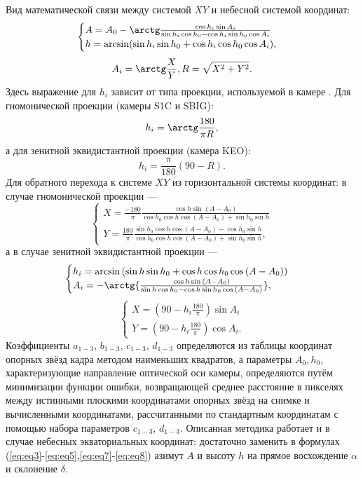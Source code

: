 \documentclass[12pt,a4paper]{article}
\begin{document}
Вид математической связи между системой $XY$ и небесной системой координат:
\begin{equation}\label{eq:eq3}
\begin{cases}
A = A_0 - \arctg\frac{\cos h_i\sin A_i}{\sin h_i \cos h_0 -\cos h_i \sin h_0 \cos A_i}\\
h = \arcsin (\sin h_i \sin h_0 + \cos h_i \cos h_0 \cos A_i),
\end{cases}
\end{equation}
\begin{equation}\label{eq:eq5}
A_i = \arctg\frac{X}{Y}, R = \sqrt{X^2 + Y^2}.
\end{equation} 
Здесь выражение для $h_i$ зависит от типа проекции, используемой в камере \cite{Calabretta2002}. Для гномонической проекции (камеры S1C и SBIG): 
\begin{equation}\label{eq:eq7}
h_i = \arctg\frac{180}{\pi R},
\end{equation}
а для зенитной эквидистантной проекции (камера KEO): 
\begin{equation}\label{eq:eq8}
h_i = \frac{\pi}{180}(90-R).
\end{equation}
Для обратного перехода к системе $XY$ из горизонтальной системы координат: в случае гномонической проекции ---
\begin{equation}\label{eq:eq8_dop}
\begin{cases}
X=\frac{-180}{\pi}\frac{\cos{h}\sin{(A-A_0)}}{\cos{h_0}\cos{h}\cos{(A-A_0)}+\sin{h_0}\sin{h}}\\
Y=\frac{180}{\pi}
\frac{\sin{h_0}\cos{h}\cos{(A-A_0)}-\cos{h_0}\sin{h}}
{\cos{h_0}\cos{h}\cos{(A-A_0)}+\sin{h_0}\sin{h}},
\end{cases}
\end{equation}
а в случае зенитной эквидистантной проекции ---
\begin{equation}\label{eq:eq9_dop}
\begin{cases}
h_i=\arcsin{(\sin{h}\sin{h_0}+\cos{h}\cos{h_0}\cos{(A-A_0)})}\\
A_i=-\arctg{\frac
	{\cos{h}\sin{(A-A_0)}}
	{\sin{h}\cos{h_0}-\cos{h}\sin{h_0}\cos{(A-A_0)}}},
\end{cases}
\end{equation}
\begin{equation}\label{eq:eq10_dop}
\begin{cases}
X= (90-h_i\frac{180}{\pi})\sin{A_i}\\
Y= (90-h_i\frac{180}{\pi})\cos{A_i}.
\end{cases}
\end{equation}
Коэффициенты $a_{1-3}$, $b_{1-3}$, $c_{1-3}$, $d_{1-3}$ определяются из таблицы координат опорных звёзд кадра методом наименьших квадратов, а параметры $A_0, h_0$, характеризующие направление оптической оси камеры, определяются путём минимизации функции ошибки, возвращающей среднее расстояние в пикселях между истинными плоскими координатами опорных звёзд на снимке и вычисленными координатами, рассчитанными по стандартным координатам с помощью набора параметров $c_{1-3}$, $d_{1-3}$.
Описанная методика работает и в случае небесных экваториальных координат: достаточно заменить в формулах (\ref{eq:eq3}-\ref{eq:eq5},\ref{eq:eq7}-\ref{eq:eq8}) азимут $A$ и высоту $h$ на прямое восхождение $\alpha$ и склонение $\delta$.
\end{document}
